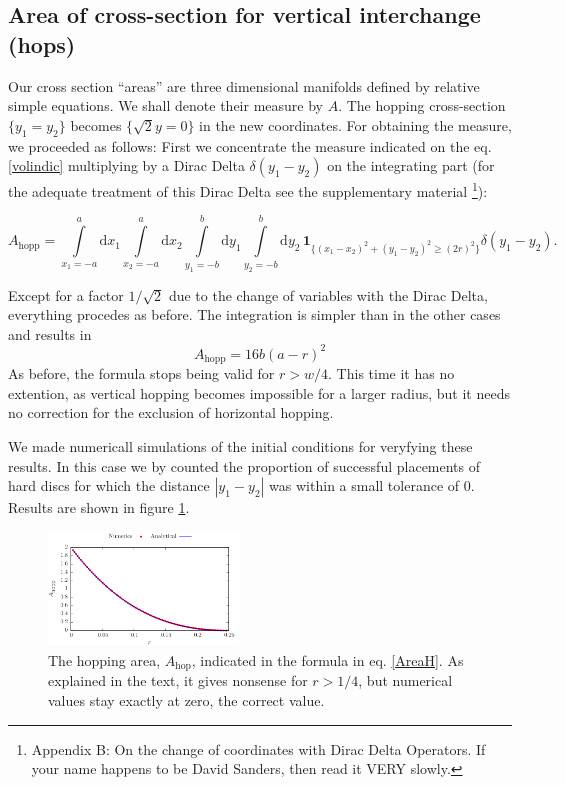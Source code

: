 \documentclass[letterpaper,10pt, jcp, aps]{revtex4-1}
\newcommand{\rd}{\!\mathrm{d}}
\newcommand{\indicator}[1]{\mathbf{1}_{ \{   #1 \} } }
\begin{document}


\subsection{Area of cross-section for
 vertical interchange (hops)}\label{areahop}

Our cross section ``areas'' are three dimensional manifolds
defined by relative simple equations. We shall denote their
measure by $A$.
The hopping cross-section 
$ \{y_1 = y_2\}$ becomes 
$\{ \sqrt{2}y=0 \}$ in the new coordinates.
For obtaining the measure,
we proceeded as follows:
First we concentrate the measure indicated on the eq. \ref{volindic}
multiplying by a Dirac Delta $\delta(y_1-y_2)$ on the integrating part
(for the adequate treatment of this Dirac Delta see the supplementary 
material \footnote{Appendix B: On the change of coordinates with Dirac Delta 
Operators. If your name happens to be David Sanders, then read it VERY slowly.}):
\begin{widetext}
\begin{equation}
 A_\text{hopp} = \int\limits_{x_1 = -a}^a \rd x_1 \int\limits_{x_2 = -a}^a \rd x_2 
\int\limits_{y_1 = -b}^b \rd y_1 \int\limits_{y_2 = -b}^b \rd y_2 \, \indicator{ (x_1-x_2)^2 + (y_1-y_2)^2 \ge (2r)^2 } \delta(y_1-y_2).
\end{equation}
\end{widetext}
Except for a factor $1/\sqrt{2}$ due to the change of variables
with the Dirac Delta, everything procedes as before. The integration is
simpler than in the other cases and results in 
\begin{equation}
 A_\text{hopp}  =  16 b(a-r)^2
\end{equation}
As before, the formula stops being valid for $r>w/4$. This time it has
no extention, as vertical hopping becomes impossible for a larger radius,
but it needs no correction for the exclusion of horizontal hopping. 

We made numericall simulations of the initial conditions for
veryfying these results. In this case we 
by counted the proportion of successful placements of hard discs 
for which the distance 
$|y_1 - y_2|$ was within a small tolerance of $0$. 
Results are shown in figure \ref{AreaHopp01}.

\begin{figure}[h]
\centering
\includegraphics[width=0.45\textwidth]{./FigurasPerfectas/AreaHop02.pdf}
\caption{The hopping area, $A_\text{hop}$, 
  indicated in the formula in eq. \ref{AreaH}. As explained
in the text, it gives nonsense for $r>1/4$, but numerical values stay
exactly at zero, the correct value. } 
\label{AreaHopp01}
\end{figure}
\end{document}
